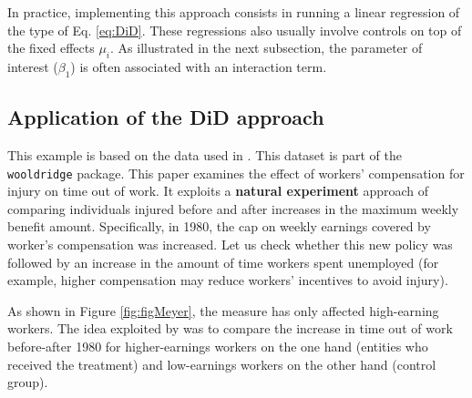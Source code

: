 \documentclass[
  12pt,
]{book}
\theoremstyle{definition}
\theoremstyle{definition}
\theoremstyle{definition}
\theoremstyle{definition}
\theoremstyle{remark}
\begin{document}
In practice, implementing this approach consists in running a linear regression of the type of Eq. \eqref{eq:DiD}. These regressions also usually involve controls on top of the fixed effects \(\mu_i\). As illustrated in the next subsection, the parameter of interest (\(\beta_1\)) is often associated with an interaction term.

\hypertarget{application-of-the-did-approach}{%
\subsection{Application of the DiD approach}\label{application-of-the-did-approach}}

This example is based on the data used in \citet{Meyer_Viscusi_Durbin_1995}. This dataset is part of the \texttt{wooldridge} package. This paper examines the effect of workers' compensation for injury on time out of work. It exploits a \textbf{natural experiment} approach of comparing individuals injured before and after increases in the maximum weekly benefit amount. Specifically, in 1980, the cap on weekly earnings covered by worker's compensation was increased. Let us check whether this new policy was followed by an increase in the amount of time workers spent unemployed (for example, higher compensation may reduce workers' incentives to avoid injury).

As shown in Figure \ref{fig:figMeyer}, the measure has only affected high-earning workers. The idea exploited by \citet{Meyer_Viscusi_Durbin_1995} was to compare the increase in time out of work before-after 1980 for higher-earnings workers on the one hand (entities who received the treatment) and low-earnings workers on the other hand (control group).
\end{document}
